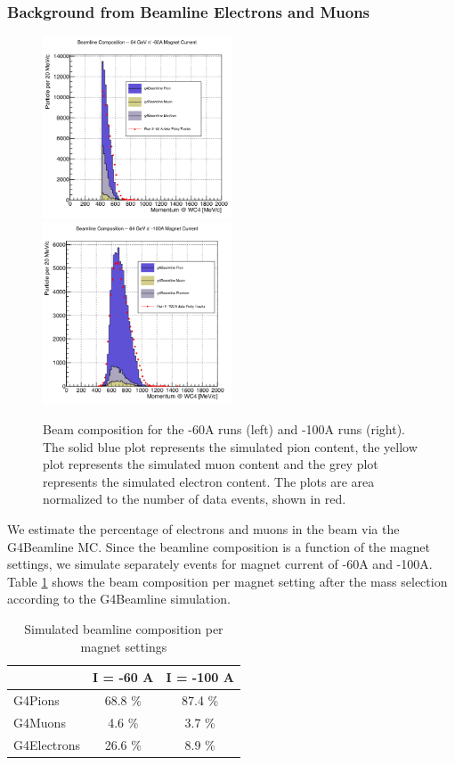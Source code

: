 \subsubsection{Background from Beamline Electrons and Muons}\label{stionEMu}
\begin{figure}[b]
\includegraphics[width=0.5\textwidth,height=\textheight,keepaspectratio]{Studies/Figures//Beam60A.png}
\includegraphics[width=0.5\textwidth,height=\textheight,keepaspectratio]{Studies/Figures//Beam100A.png}
\caption{Beam composition for the -60A runs (left) and -100A runs (right). The solid blue plot represents the simulated pion content, the yellow plot represents the simulated muon content and the grey plot represents the simulated electron content. The plots are area normalized to the number of data events, shown in red. }
\label{fig:BeamComposition}
\end{figure}

We estimate the percentage of electrons and muons in the beam via the G4Beamline MC. 
Since the beamline composition is a function of the magnet settings, we simulate separately events for magnet current of -60A and -100A. 
Table \ref{tab:beamline} shows the beam composition per magnet setting after the mass selection according to the G4Beamline simulation.
\begin{table}[p]
\centering
\begin{tabular}{|l|c|c|}
\hline
                     & I = -60 A           & I = -100 A \\ \hline
G4Pions       &   68.8 \%           &      87.4 \%        \\ \hline
G4Muons     &     4.6 \%           &        3.7 \%         \\ \hline
G4Electrons &   26.6 \%           &        8.9 \%        \\ \hline
\end{tabular}
\caption{Simulated beamline composition per magnet settings}
\label{tab:beamline}
\end{table}


